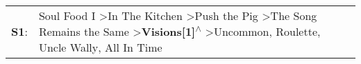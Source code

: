 \begin{supertabular}{p{0.03\textwidth}p{0.92\textwidth}}
 \textbf{S1}:  &  Soul Food I\textsuperscript{} \textgreater \enspace In The Kitchen\textsuperscript{} \textgreater \enspace Push the Pig\textsuperscript{} \textgreater \enspace The Song Remains the Same\textsuperscript{} \textgreater \enspace \textbf{Visions[1]\textsuperscript{$\wedge$}} \textgreater \enspace Uncommon\textsuperscript{}, \enspace Roulette\textsuperscript{}, \enspace Uncle Wally\textsuperscript{}, \enspace All In Time\textsuperscript{}  \enspace  \\
\end{supertabular}

